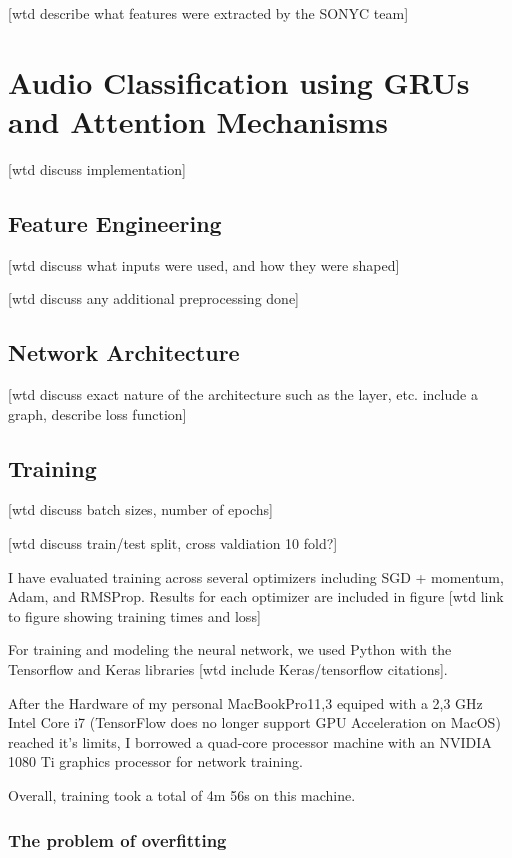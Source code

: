 
[wtd describe what features were extracted by the SONYC team]

\chapter{Audio Classification using GRUs and Attention Mechanisms}

[wtd discuss implementation]

\section{Feature Engineering}

[wtd discuss what inputs were used, and how they were shaped]

[wtd discuss any additional preprocessing done]

\section{Network Architecture}

[wtd discuss exact nature of the architecture such as the layer, etc. include a graph, describe loss function]

\section{Training}

[wtd discuss batch sizes, number of epochs]

[wtd discuss train/test split, cross valdiation 10 fold?]

I have evaluated training across several optimizers including SGD + momentum, Adam, and RMSProp.  Results for each optimizer are included in figure [wtd link to figure showing training times and loss]

For training and modeling the neural network, we used Python with the Tensorflow and Keras libraries [wtd include Keras/tensorflow citations].

After the Hardware of my personal MacBookPro11,3 equiped with a 2,3 GHz Intel Core i7 (TensorFlow does no longer support GPU Acceleration on MacOS) reached it's limits, I borrowed a quad-core processor machine with an NVIDIA 1080 Ti graphics processor for network training.

Overall, training took a total of 4m 56s on this machine.

\subsection{The problem of overfitting}

